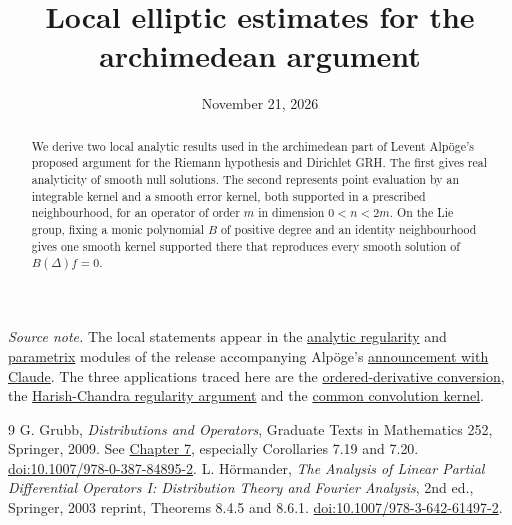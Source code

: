 \documentclass[11pt,reqno]{amsart}
\title[Local elliptic estimates]{Local elliptic estimates for the archimedean argument}
\date{November 21, 2026}
\newcommand{\gsource}{https://github.com/Deicyde/riemann-hypothesis/blob/40e56bab026552e089d7afcfeff08d2defb9c005/src/GroundTheory/AutomorphicForms}
\begin{document}
\begin{abstract}
We derive two local analytic results used in the archimedean part of
Levent Alp\"oge's proposed argument for the Riemann hypothesis and Dirichlet
GRH. The first gives real analyticity of smooth null solutions. The second
represents point evaluation by an integrable kernel and a smooth error kernel,
both supported in a prescribed neighbourhood, for an operator of order \(m\)
in dimension \(0<n<2m\). On the Lie group, fixing a monic
polynomial \(B\) of positive degree and an identity neighbourhood gives one
smooth kernel supported there that reproduces every smooth solution of \(B(\Delta)f=0\).
\end{abstract}
\maketitle

\par\smallskip
\noindent\emph{Source note.}
The local statements appear in the
\href{\gsource/PartialDifferential/AnalyticHypoelliptic.lean}{analytic regularity}
and \href{\gsource/PartialDifferential/EllipticParametrix.lean}{parametrix}
modules of the release accompanying Alp\"oge's \href{https://alpo.ge/remark.pdf}{announcement with Claude}.
The three applications traced here are the
\href{\gsource/HarishChandraRegularity/TupleOp.lean}{ordered-derivative conversion},
the \href{\gsource/HarishChandraRegularity.lean}{Harish-Chandra regularity argument}
and the \href{\gsource/AutomorphicFormSpaces/GKStableConv.lean}{common convolution kernel}.

\begin{thebibliography}{9}
G. Grubb, \emph{Distributions and Operators}, Graduate Texts in Mathematics
252, Springer, 2009. See \href{https://web.math.ku.dk/~grubb/dist7n.pdf}{Chapter 7},
especially Corollaries 7.19 and 7.20.
\href{https://doi.org/10.1007/978-0-387-84895-2}{doi:10.1007/978-0-387-84895-2}.
L. H\"ormander, \emph{The Analysis of Linear Partial Differential Operators I:
Distribution Theory and Fourier Analysis}, 2nd ed., Springer, 2003 reprint,
Theorems 8.4.5 and 8.6.1.
\href{https://doi.org/10.1007/978-3-642-61497-2}{doi:10.1007/978-3-642-61497-2}.
\end{thebibliography}
\end{document}
